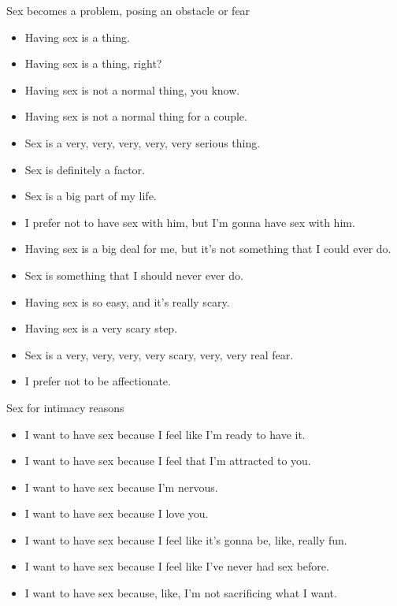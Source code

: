 \documentclass[11pt]{article}
\begin{document}
\begin{enumerate}
\begin{enumerate}
Sex becomes a problem, posing an obstacle or fear
\begin{itemize}
\item Having sex is a thing.
\item Having sex is a thing, right?
\item Having sex is not a normal thing, you know.
\item Having sex is not a normal thing for a couple.
\item Sex is a very, very, very, very, very serious thing.
\item Sex is definitely a factor.
\item Sex is a big part of my life.
\item I prefer not to have sex with him, but I'm gonna have sex with him.
\item Having sex is a big deal for me, but it's not something that I could
ever do.
\item Sex is something that I should never ever do.
\item Having sex is so easy, and it's really scary.
\item Having sex is a very scary step.
\item Sex is a very, very, very, very scary, very, very real fear.
\item I prefer not to be affectionate.
\end{itemize}

Sex for intimacy reasons
\begin{itemize}
\item I want to have sex because I feel like I'm ready to have it.
\item I want to have sex because I feel that I'm attracted to you.
\item I want to have sex because I'm nervous.
\item I want to have sex because I love you.
\item I want to have sex because I feel like it's gonna be, like, really
fun.
\item I want to have sex because I feel like I've never had sex before.
\item I want to have sex because, like, I'm not sacrificing what I want.
\end{itemize}
\end{enumerate}








\end{enumerate}
\end{document}
